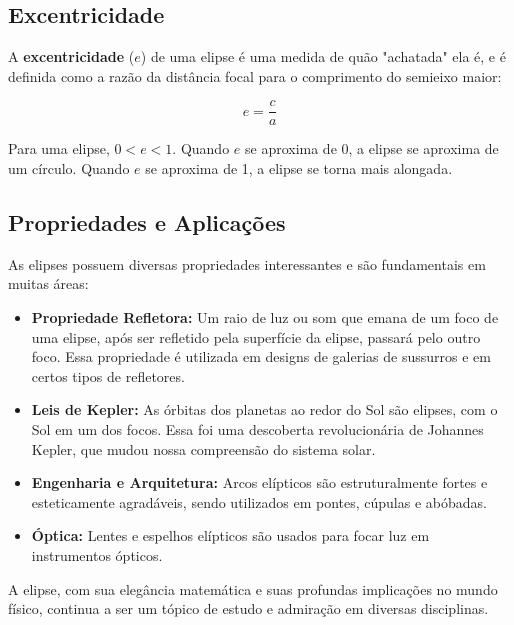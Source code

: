 \documentclass{article}
\begin{document}
\subsection*{Excentricidade}

A \textbf{excentricidade} ($e$) de uma elipse é uma medida de quão "achatada" ela é, e é definida como a razão da distância focal para o comprimento do semieixo maior:

$$e = \frac{c}{a}$$

Para uma elipse, $0 < e < 1$. Quando $e$ se aproxima de 0, a elipse se aproxima de um círculo. Quando $e$ se aproxima de 1, a elipse se torna mais alongada.

\subsection*{Propriedades e Aplicações}

As elipses possuem diversas propriedades interessantes e são fundamentais em muitas áreas:

\begin{itemize}
    \item \textbf{Propriedade Refletora:} Um raio de luz ou som que emana de um foco de uma elipse, após ser refletido pela superfície da elipse, passará pelo outro foco. Essa propriedade é utilizada em designs de galerias de sussurros e em certos tipos de refletores.
    \item \textbf{Leis de Kepler:} As órbitas dos planetas ao redor do Sol são elipses, com o Sol em um dos focos. Essa foi uma descoberta revolucionária de Johannes Kepler, que mudou nossa compreensão do sistema solar.
    \item \textbf{Engenharia e Arquitetura:} Arcos elípticos são estruturalmente fortes e esteticamente agradáveis, sendo utilizados em pontes, cúpulas e abóbadas.
    \item \textbf{Óptica:} Lentes e espelhos elípticos são usados para focar luz em instrumentos ópticos.
\end{itemize}

A elipse, com sua elegância matemática e suas profundas implicações no mundo físico, continua a ser um tópico de estudo e admiração em diversas disciplinas.
\end{document}
